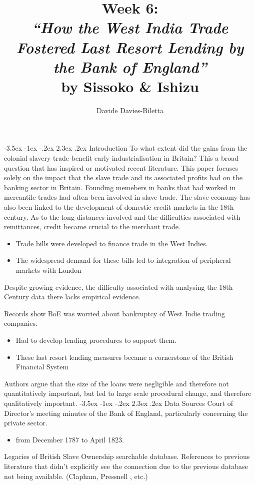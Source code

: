 \documentclass[]{article}
\title{Week 6:\\
	 \textit{``How the West India Trade Fostered Last Resort Lending by the Bank of England''}\\
	  by Sissoko \& Ishizu}
\author{Davide Davies-Biletta}
\makeatletter
\newcommand{\bb}{\bigbreak\noindent}
\renewcommand\section{\leftskip 0pt\@startsection {section}{1}{\z@}%
	{-3.5ex \@plus -1ex \@minus -.2ex}%
	{2.3ex \@plus.2ex}%
	{\normalfont\Large\bfseries}}
\makeatother
\begin{document}
\maketitle

\section{Introduction}
 To what extent did the gains from the colonial slavery trade benefit early industrialisation in Britain? This a broad question that has inspired or motivated recent literature. This paper focuses solely on the impact that the slave trade and its associated profits had on the banking sector in Britain.
 \bb
 Founding memebers in banks that had worked in mercantile trades had often been involved in slave trade.
 \bb
 The slave economy has also been linked to the development of domestic credit markets in the 18th century. As to the long distances involved and the difficulties associated with remittances, credit became crucial to the merchant trade.
 \begin{itemize}
 	\item Trade bills were developed to finance trade in the West Indies.
 	\item The widespread demand for these bills led to integration of peripheral markets with London
 \end{itemize}
Despite growing evidence, the difficulty associated with analysing the 18th Century data there lacks empirical evidence.

\bb
Records show BoE was worried about bankruptcy of West Indie trading companies.
\begin{itemize}[leftmargin=10ex]
	\item Had to develop lending procedures to support them.
	\item These last resort lending measures became a cornerstone of the British Financial System
\end{itemize}

\bb
Authors argue that the size of the loans were negligible and therefore not quantitatively important, but led to large scale procedural change, and therefore qualitatively important.
\section{Data Sources}
Court of Director's meeting minutes of the Bank of England, particularly concerning the private sector.
\begin{itemize}[leftmargin=10ex]
	\item from December 1787 to April 1823.
\end{itemize}
\bb
Legacies of British Slave Ownership searchable database.
\bb
References to previous literature that didn't explicitly see the connection due to the previous database not being available. (Clapham, Pressnell , etc.)
\end{document}
